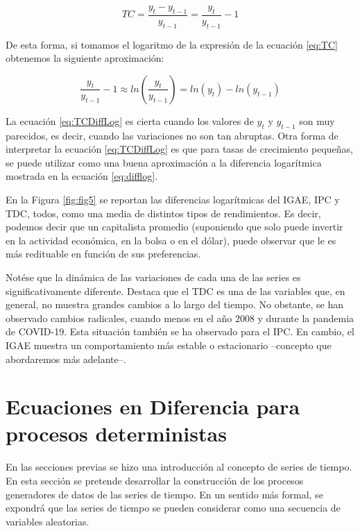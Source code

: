 \documentclass[
]{book}
\begin{document}
\begin{equation}
    TC = \frac{y_t - y_{t-1}}{y_{t-1}} = \frac{y_t}{y_{t-1}} - 1
    \label{eq:TC}
\end{equation}

De esta forma, si tomamos el logaritmo de la expresión de la ecuación \eqref{eq:TC} obtenemos la siguiente aproximación:

\begin{equation}
    \frac{y_t}{y_{t-1}} -1  \approx ln \left( \frac{y_t}{y_{t-1}} \right) = ln(y_t) - ln(y_{t-1})
    \label{eq:TCDiffLog}
\end{equation}

La ecuación \eqref{eq:TCDiffLog} es cierta cuando los valores de \(y_t\) y \(y_{t-1}\) son muy parecidos, es decir, cuando las variaciones no son tan abruptas. Otra forma de interpretar la ecuación \eqref{eq:TCDiffLog} es que para tasas de crecimiento pequeñas, se puede utilizar como una buena aproximación a la diferencia logarítmica mostrada en la ecuación \eqref{eq:difflog}.

En la Figura \ref{fig:fig5} se reportan las diferencias logarítmicas del IGAE, IPC y TDC, todos, como una media de distintos tipos de rendimientos. Es decir, podemos decir que un capitalista promedio (suponiendo que solo puede invertir en la actividad económica, en la bolsa o en el dólar), puede observar que le es más redituable en función de sus preferencias.

Notése que la dinámica de las variaciones de cada una de las series es significativamente diferente. Destaca que el TDC es una de las variables que, en general, no muestra grandes cambios a lo largo del tiempo. No obstante, se han observado cambios radicales, cuando menos en el año 2008 y durante la pandemia de COVID-19. Esta situación también se ha observado para el IPC. En cambio, el IGAE muestra un comportamiento más estable o estacionario --concepto que abordaremos más adelante--.

\hypertarget{ecuaciones-en-diferencia-para-procesos-deterministas}{%
\section{Ecuaciones en Diferencia para procesos deterministas}\label{ecuaciones-en-diferencia-para-procesos-deterministas}}

En las secciones previas se hizo una introducción al concepto de series de tiempo. En esta sección se pretende desarrollar la construcción de los procesos generadores de datos de las series de tiempo. En un sentido más formal, se expondrá que las series de tiempo se pueden considerar como una secuencia de variables aleatorias.
\end{document}
